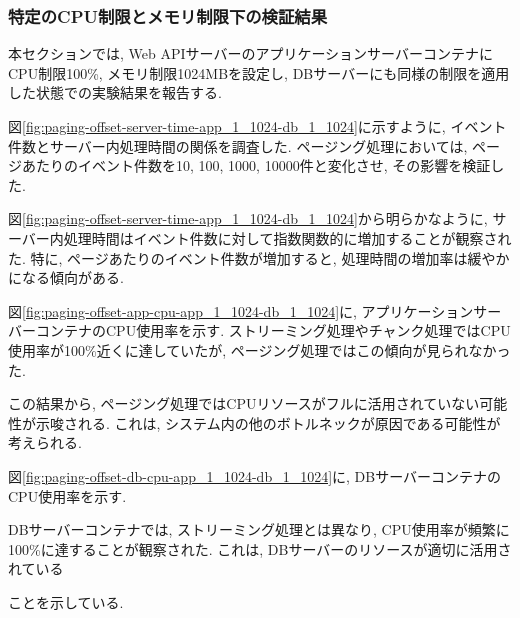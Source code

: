 \documentclass[../../../../main]{subfiles}
\begin{document}
    \subsubsection{特定のCPU制限とメモリ制限下の検証結果}\label{subsubsec:result-paging-offset-only-limit}

    本セクションでは, Web APIサーバーのアプリケーションサーバーコンテナにCPU制限100\%, メモリ制限1024MBを設定し, DBサーバーにも同様の制限を適用した状態での実験結果を報告する.

    \label{subsubsubsec:result-paging-offset-only-limit-server-time}

    図\ref{fig:paging-offset-server-time-app_1_1024-db_1_1024}に示すように, イベント件数とサーバー内処理時間の関係を調査した. ページング処理においては, ページあたりのイベント件数を10, 100, 1000, 10000件と変化させ, その影響を検証した.

    

    図\ref{fig:paging-offset-server-time-app_1_1024-db_1_1024}から明らかなように, サーバー内処理時間はイベント件数に対して指数関数的に増加することが観察された. 特に, ページあたりのイベント件数が増加すると, 処理時間の増加率は緩やかになる傾向がある.

    \label{subsubsubsec:result-paging-offset-only-limit-cpu}

    図\ref{fig:paging-offset-app-cpu-app_1_1024-db_1_1024}に, アプリケーションサーバーコンテナのCPU使用率を示す. ストリーミング処理やチャンク処理ではCPU使用率が100\%近くに達していたが, ページング処理ではこの傾向が見られなかった.

    

    この結果から, ページング処理ではCPUリソースがフルに活用されていない可能性が示唆される. これは, システム内の他のボトルネックが原因である可能性が考えられる.

    図\ref{fig:paging-offset-db-cpu-app_1_1024-db_1_1024}に, DBサーバーコンテナのCPU使用率を示す.

    

    DBサーバーコンテナでは, ストリーミング処理とは異なり, CPU使用率が頻繁に100\%に達することが観察された. これは, DBサーバーのリソースが適切に活用されている

    ことを示している.

    \label{subsubsubsec:result-paging-offset-only-limit-mem}
\end{document}
